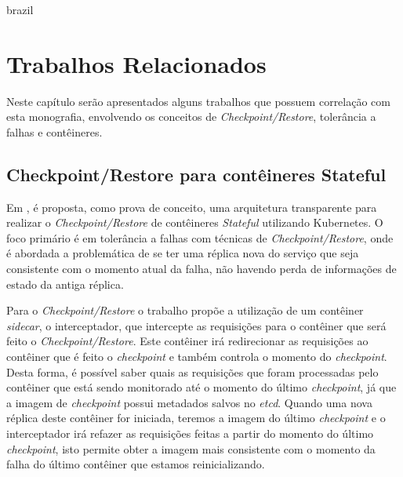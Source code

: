 

\begin{otherlanguage*}{brazil}
\chapter{Trabalhos Relacionados}\label{cap:trabalhos:relacionados}

Neste capítulo serão apresentados alguns trabalhos que possuem correlação
com esta monografia, envolvendo os conceitos de \textit{Checkpoint/Restore},
tolerância a falhas e contêineres.

\section{Checkpoint/Restore para contêineres Stateful}

Em \cite{muller2022architecture}, é proposta, como prova de conceito, uma
arquitetura transparente para realizar o \textit{Checkpoint/Restore} de
contêineres \textit{Stateful} utilizando Kubernetes. O foco primário é em
tolerância a falhas com técnicas de \textit{Checkpoint/Restore}, onde é
abordada a problemática de se ter uma réplica nova do serviço que seja
consistente com o momento atual da falha, não havendo perda de informações
de estado da antiga réplica.

Para o \textit{Checkpoint/Restore} o trabalho propõe a utilização de um
contêiner \textit{sidecar}, o interceptador, que intercepte as requisições
para o contêiner que será feito o \textit{Checkpoint/Restore}. Este contêiner
irá redirecionar as requisições ao contêiner que é feito o \textit{checkpoint}
e também controla o momento do \textit{checkpoint}. Desta forma, é possível
saber quais as requisições que foram processadas pelo contêiner que está sendo
monitorado até o momento do último \textit{checkpoint}, já que a imagem de
\textit{checkpoint} possui metadados salvos no \textit{etcd}. Quando uma nova
réplica deste contêiner for iniciada, teremos a imagem do último
\textit{checkpoint} e o interceptador irá refazer as requisições feitas a
partir do momento do último \textit{checkpoint}, isto permite obter a imagem
mais consistente com o momento da falha do último contêiner que estamos
reinicializando.


\end{otherlanguage*}
